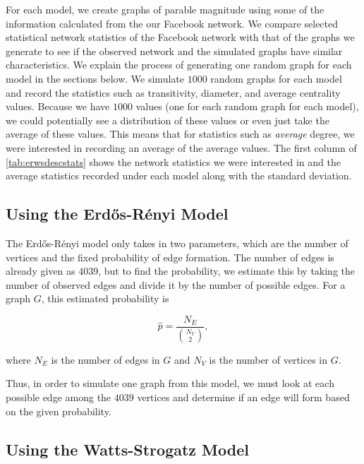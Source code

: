 \documentclass[12pt,twoside]{amherstthesis}
\begin{document}
  For each model, we create graphs of parable magnitude using some of the
  information calculated from the our Facebook network. We compare
  selected statistical network statistics of the Facebook network with
  that of the graphs we generate to see if the observed network and the
  simulated graphs have similar characteristics. We explain the process of
  generating one random graph for each model in the sections below. We
  simulate \(1000\) random graphs for each model and record the statistics
  such as transitivity, diameter, and average centrality values. Because
  we have \(1000\) values (one for each random graph for each model), we
  could potentially see a distribution of these values or even just take
  the average of these values. This means that for statistics such as
  \emph{average} degree, we were interested in recording an average of the
  average values. The first column of \autoref{tab:erwsdescstats} shows
  the network statistics we were interested in and the average statistics
  recorded under each model along with the standard deviation.
  
  \subsection{Using the Erdős-Rényi
  Model}\label{using-the-erdos-renyi-model}
  
  The Erdős-Rényi model only takes in two parameters, which are the number
  of vertices and the fixed probability of edge formation. The number of
  edges is already given as \(4039\), but to find the probability, we
  estimate this by taking the number of observed edges and divide it by
  the number of possible edges. For a graph \(G\), this estimated
  probability is
  
  \[\hat{p} = \frac {N_{E}} {{N_{V} \choose 2}},\]
  
  where \(N_{E}\) is the number of edges in \(G\) and \(N_{V}\) is the
  number of vertices in \(G\).
  
  Thus, in order to simulate one graph from this model, we must look at
  each possible edge among the \(4039\) vertices and determine if an edge
  will form based on the given probability.
  
  \subsection{Using the Watts-Strogatz
  Model}\label{using-the-watts-strogatz-model}
  
\end{document}
